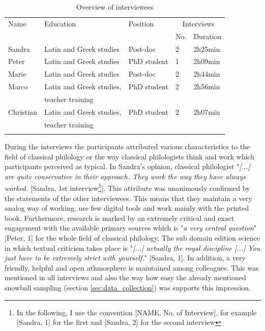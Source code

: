 \documentclass[12pt, a4paper, titlepage, oneside, abstract=true, toc=listof, toc=bibliography]{scrreprt}
\begin{document}
\small
\begin{table}
\caption{Overview of interviewees}
\label{tab:interviewees}
\centering
\begin{tabular}{lllll}
& & & &\\
\hline
Name & Education & Position & \multicolumn{2}{c}{Interviews}\\
 & &  & No. & Duration\\
\hline
\hline
Sandra & Latin and Greek studies & Post-doc & 2 & 2h25min\\
Peter & Latin and Greek studies & PhD student & 1 & 2h09min\\
Marie & Latin and Greek studies & Post-doc & 2 & 2h44min\\
Marco & Latin and Greek studies, & PhD student & 2 & 2h56min\\
      & teacher training & & & \\
Christian & Latin and Greek studies, & PhD student & 2 & 2h07min\\
      & teacher training & & & \\
\hline
& & & &\\
\end{tabular}
\end{table}
\normalsize

During the interviews the participants attributed various characteristics to the field of classical philology or the way classical philologists think and work which participants perceived as typical. %
In Sandra's opinion, classical philologist "\textit{[...] are quite conservative in their approach. They work the way they have always worked.} [Sandra, 1st interview\footnote{In the following, I use the convention [NAME, No. of Interview], for example [Sandra, 1] for the first and [Sandra, 2] for the second interview}]. This attribute was unanimously confirmed by the statements of the other interviewees. This means that they maintain a very analog way of working, use few digital tools and work mainly with the printed book. %
Furthermore, research is marked by an extremely critical and exact engagement with the available primary sources which is "\textit{a very central question}" [Peter, 1] for the whole field of classical philology. The sub domain edition science in which textual criticism takes place is "\textit{[...] actually the royal discipline [...] You just have to be extremely strict with yourself.}" [Sandra, 1]. In addition, a very friendly, helpful and open athmosphere is maintained among colleagues. This was mentioned in all interviews and also the way how easy the already mentioned snowball sampling (section \ref{sec:data_collection}) was supports this impression.
\end{document}
